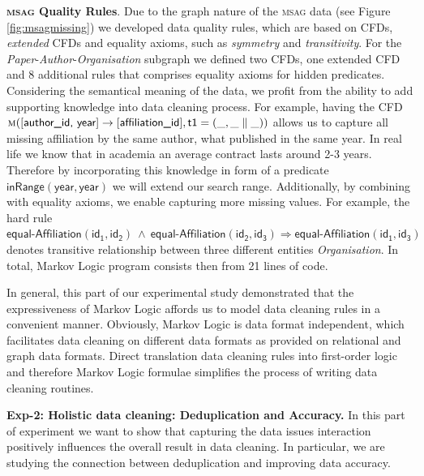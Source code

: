 \textbf{\textsc{msag} Quality Rules}.  
Due to the graph nature of the \textsc{msag} data (see Figure \ref{fig:msagmissing}) we developed data quality rules, which are based on CFDs, \textit{extended} CFDs \cite{Chen2009extended} and equality axioms, such as \textit{symmetry} and \textit{transitivity}. For the \textit{Paper}-\textit{Author}-\textit{Organisation} subgraph we defined two CFDs, one extended CFD and 8 additional rules that comprises equality axioms for hidden predicates. Considering the semantical meaning of the data, we profit from the ability to add supporting knowledge into data cleaning process. For example, having the CFD$\mathsf{\textsc{m}([\textsf{author\_id, year}] \rightarrow [\textsf{affiliation\_id}],t1=(\_,\_ \parallel \_))} $  allows us to capture all missing affiliation by the same author, what published in the same year. In real life we know that in academia an average contract lasts around 2-3 years. Therefore by incorporating this knowledge in form of a predicate $\mathsf{\textsf{inRange}(year, year)}$ we will extend our search range. Additionally, by combining with equality axioms, we enable capturing more missing values. For example, the hard rule $\mathsf{\textsf{equal-Affiliation}(id_1, id_2) ~\wedge~ \textsf{equal-Affiliation}(id_2, id_3) \Rightarrow  \textsf{equal-Affiliation}(id_1, id_3)}$ denotes transitive relationship between three different entities \textit{Organisation}. In total, Markov Logic program consists then from 21 lines of code.

In general, this part of our experimental study demonstrated that the expressiveness of Markov Logic affords us to model data cleaning rules in a convenient manner. Obviously, Markov Logic is data format independent, which facilitates data cleaning on different data formats as provided on relational and graph data formats. Direct translation data cleaning rules into first-order logic and therefore Markov Logic formulae simplifies the process of writing data cleaning routines. 

\textbf{Exp-2: Holistic data cleaning: Deduplication and Accuracy.} In this part of experiment we want to show that capturing the data issues interaction  positively influences the overall result in data cleaning. In particular, we are studying the connection between deduplication and improving data accuracy.

